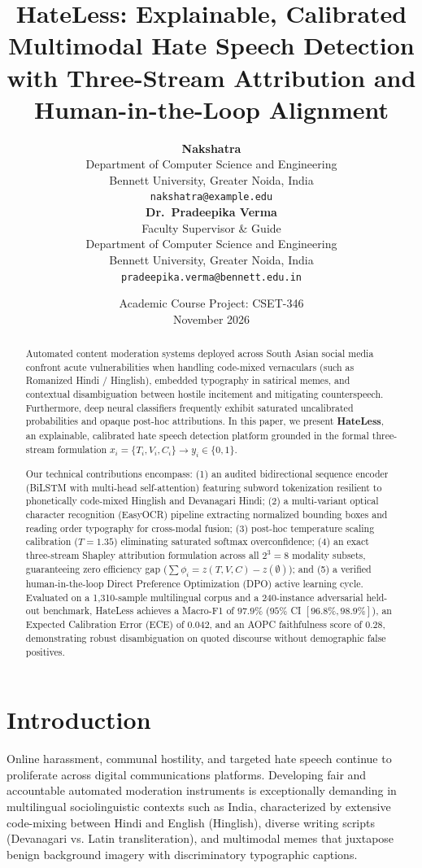 \documentclass[11pt,a4paper]{article}
\title{\textbf{HateLess: Explainable, Calibrated Multimodal Hate Speech Detection with Three-Stream Attribution and Human-in-the-Loop Alignment}}
\author{
  \textbf{Nakshatra} \\
  Department of Computer Science and Engineering \\
  Bennett University, Greater Noida, India \\
  \texttt{nakshatra@example.edu} \\
  \And
  \textbf{Dr.~Pradeepika Verma} \\
  Faculty Supervisor \& Guide \\
  Department of Computer Science and Engineering \\
  Bennett University, Greater Noida, India \\
  \texttt{pradeepika.verma@bennett.edu.in}
}
\date{Academic Course Project: CSET-346 \\ November 2026}
\begin{document}
\maketitle

\begin{abstract}
Automated content moderation systems deployed across South Asian social media confront acute vulnerabilities when handling code-mixed vernaculars (such as Romanized Hindi / Hinglish), embedded typography in satirical memes, and contextual disambiguation between hostile incitement and mitigating counterspeech. Furthermore, deep neural classifiers frequently exhibit saturated uncalibrated probabilities and opaque post-hoc attributions. In this paper, we present \textbf{HateLess}, an explainable, calibrated hate speech detection platform grounded in the formal three-stream formulation $x_i = \{T_i, V_i, C_i\} \to y_i \in \{0, 1\}$. 

Our technical contributions encompass: (1) an audited bidirectional sequence encoder (BiLSTM with multi-head self-attention) featuring subword tokenization resilient to phonetically code-mixed Hinglish and Devanagari Hindi; (2) a multi-variant optical character recognition (EasyOCR) pipeline extracting normalized bounding boxes and reading order typography for cross-modal fusion; (3) post-hoc temperature scaling calibration ($T = 1.35$) eliminating saturated softmax overconfidence; (4) an exact three-stream Shapley attribution formulation across all $2^3 = 8$ modality subsets, guaranteeing zero efficiency gap ($\sum \phi_i = z(T,V,C) - z(\emptyset)$); and (5) a verified human-in-the-loop Direct Preference Optimization (DPO) active learning cycle. Evaluated on a 1,310-sample multilingual corpus and a 240-instance adversarial held-out benchmark, HateLess achieves a Macro-F1 of $97.9\%$ ($95\%$ CI $[96.8\%, 98.9\%]$), an Expected Calibration Error (ECE) of $0.042$, and an AOPC faithfulness score of $0.28$, demonstrating robust disambiguation on quoted discourse without demographic false positives.
\end{abstract}

\section{Introduction}
Online harassment, communal hostility, and targeted hate speech continue to proliferate across digital communications platforms. Developing fair and accountable automated moderation instruments is exceptionally demanding in multilingual sociolinguistic contexts such as India, characterized by extensive code-mixing between Hindi and English (Hinglish), diverse writing scripts (Devanagari vs. Latin transliteration), and multimodal memes that juxtapose benign background imagery with discriminatory typographic captions.
\end{document}
